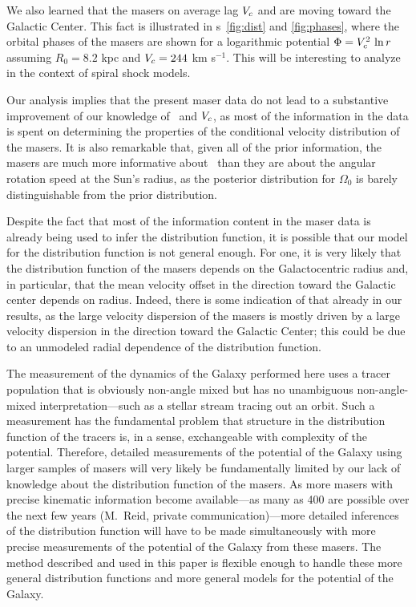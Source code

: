 We also learned that the masers on average lag $V_c$ and are moving
toward the Galactic Center. This fact is illustrated in \figurename
s~\ref{fig:dist} and \ref{fig:phases}, where the orbital phases of the
masers are shown for a logarithmic potential $\Phi = V_c^2 \,\ln r$
\citep[\eg, \eqnname~(3.14) in][]{binneytremaine} assuming $R_0 = 8.2$
kpc and $V_c = 244$ km s$^{-1}$. This will be interesting to analyze
in the context of spiral shock models.

Our analysis implies that the present maser data do not lead to a
substantive improvement of our knowledge of \Ro\ and $V_c$, as most of
the information in the data is spent on determining the properties of
the conditional velocity distribution of the masers. It is also
remarkable that, given all of the prior information, the masers are
much more informative about \Ro\ than they are about the angular
rotation speed at the Sun's radius, as the posterior distribution for
$\Omega_0$ is barely distinguishable from the prior distribution.

Despite the fact that most of the information content in the maser
data is already being used to infer the distribution function, it is
possible that our model for the distribution function is not general
enough. For one, it is very likely that the distribution function of
the masers depends on the Galactocentric radius and, in particular,
that the mean velocity offset in the direction toward the Galactic
center depends on radius. Indeed, there is some indication of that
already in our results, as the large velocity dispersion of the masers
is mostly driven by a large velocity dispersion in the direction
toward the Galactic Center; this could be due to an unmodeled radial
dependence of the distribution function.

The measurement of the dynamics of the Galaxy performed here uses a
tracer population that is obviously non-angle mixed but has no
unambiguous non-angle-mixed interpretation---such as a stellar stream
tracing out an orbit. Such a measurement has the fundamental problem
that structure in the distribution function of the tracers is, in a
sense, exchangeable with complexity of the potential. Therefore,
detailed measurements of the potential of the Galaxy using larger
samples of masers will very likely be fundamentally limited by our
lack of knowledge about the distribution function of the masers. As
more masers with precise kinematic information become available---as
many as 400 are possible over the next few years (M.~Reid, private
communication)---more detailed inferences of the distribution function
will have to be made simultaneously with more precise measurements of
the potential of the Galaxy from these masers. The method described
and used in this paper is flexible enough to handle these more general
distribution functions and more general models for the potential of
the Galaxy.

